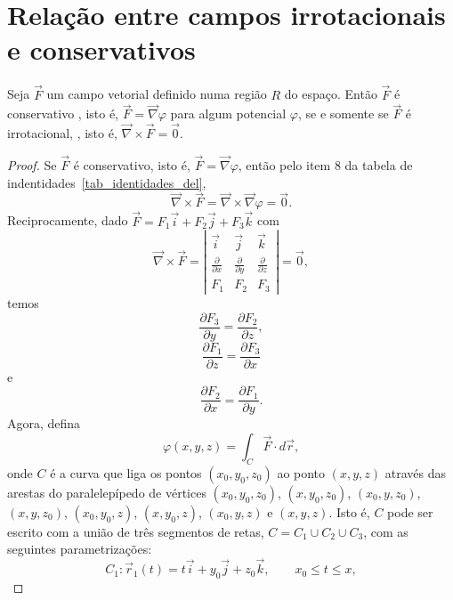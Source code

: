 \section{Relação entre campos irrotacionais e conservativos}
\begin{teo}Seja $\vec{F}$ um campo vetorial definido numa região $R$ do espaço. Então $\vec{F}$ é conservativo , isto é, $\vec{F}=\vec{\nabla}\varphi$ para algum potencial $\varphi$, se e somente se $\vec{F}$ é irrotacional, , isto é, $\vec{\nabla}\times \vec{F}=\vec{0}$.
\end{teo}
\begin{proof}Se $\vec{F}$ é conservativo, isto é, $\vec{F}=\vec{\nabla}\varphi$, então pelo item 8 da tabela de indentidades~\ref{tab_identidades_del}, $$\vec{\nabla}\times \vec{F}=\vec{\nabla}\times \vec{\nabla}\varphi=\vec{0}.$$
Reciprocamente, dado $\vec{F}=F_1\vec{i}+F_2\vec{j}+F_3\vec{k}$ com 
$$
\vec{\nabla }\times \vec{F}=\left| \begin{array}{ccc}
 \vec{i} & \vec{j} & \vec{k} \\
 \frac{\partial}{\partial x} &\frac{\partial}{\partial y} &\frac{\partial}{\partial z} \\
F_1 & F_2 & F_3
 \end{array}\right|=\vec{0},
 $$ 
temos
\begin{equation}\label{rot_zero_eq1}
 \frac{\partial F_3}{\partial y}=\frac{\partial F_2}{\partial z},
\end{equation}
\begin{equation}\label{rot_zero_eq2}
 \frac{\partial F_1}{\partial z}=\frac{\partial F_3}{\partial x}
\end{equation}
e
\begin{equation}\label{rot_zero_eq3}
 \frac{\partial F_2}{\partial x}=\frac{\partial F_1}{\partial y}.
\end{equation}
Agora, defina
\begin{equation}\label{def_pot_campo_conser}
\varphi(x,y,z)=\int_C \vec{F}\cdot d\vec{r},
\end{equation}
onde $C$ é a curva que liga os pontos $(x_0,y_0,z_0)$ ao ponto $(x,y,z)$ através das arestas do paralelepípedo de vértices $(x_0,y_0,z_0)$, $(x,y_0,z_0)$, $(x_0,y,z_0)$, $(x,y,z_0)$, $(x_0,y_0,z)$, $(x,y_0,z)$, $(x_0,y,z)$ e $(x,y,z)$. Isto é, $C$ pode ser escrito com a união de três segmentos de retas, $C=C_1 \cup C_2\cup C_3$, com as seguintes parametrizações: 
$$
C_1: \vec{r}_1(t)=t\vec{i}+y_0\vec{j}+z_0\vec{k},\qquad x_0\leq t\leq x,
$$
\end{proof}
